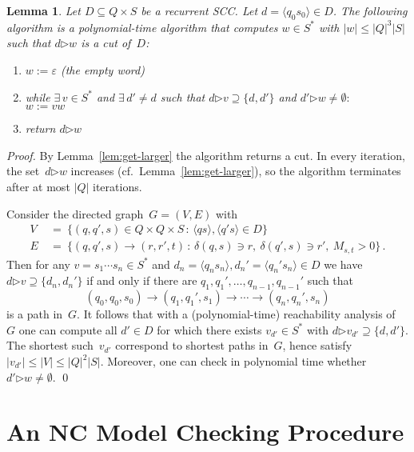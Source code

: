 \documentclass{elsarticle}
\newtheorem{lemma}[definition]{Lemma}
\def\<{\langle}
\def\>{\rangle}
\newcommand{\then}{\mathord{\triangleright}}
\begin{document}
\begin{lemma} \label{lem:compute-cut}
Let $D \subseteq Q \times S$ be a recurrent SCC.
Let $d = \<q_0 s_0\> \in D$.
The following algorithm is a polynomial-time algorithm that computes $w \in S^*$ with $|w| \leqslant |Q|^3 |S|$ such that $d \then w$ is a cut of~$D$:
\begin{enumerate}
\item $w := \varepsilon$ (the empty word)
\item while $\exists\, v \in S^*$ and $\exists\, d' \ne d$ such that $d \then v \supseteq \{d, d'\}$ and $d' \then w \ne \emptyset:$ \\
\mbox{}\hspace{4mm} $w := v w$
\item return $d \then w$
\end{enumerate}
\end{lemma}
\begin{proof}
By Lemma~\ref{lem:get-larger} the algorithm returns a cut.
In every iteration, the set~$d \then w$ increases (cf.~Lemma~\ref{lem:get-larger}), so the algorithm terminates after at most $|Q|$ iterations.

Consider the directed graph~$G = (V,E)$ with
\begin{align*}
V &\ = \ \{ (q, q', s) \in Q \times Q \times S \, : \, \<q s\>, \<q' s\> \in D \} \\
E &\ = \ \{ (q, q', s) \to (r, r', t) \, : \, \delta(q,s) \ni r,\ \delta(q',s) \ni r',\ M_{s,t} > 0\}\,.
\end{align*}
Then for any $v = s_1 \cdots s_n \in S^*$ and $d_n = \<q_n s_n\>, d_n' = \<q_n' s_n\> \in D$ we have $d \then v \supseteq \{d_n, d_n'\}$ if and only if there are $q_1, q_1', \ldots, q_{n-1}, q_{n-1}'$ such that
\[
(q_0,q_0,s_0) \to (q_1,q_1',s_1) \to \cdots \to (q_n,q_n',s_n)
\]
is a path in~$G$.
It follows that with a (polynomial-time) reachability analysis of~$G$ one can compute all $d' \in D$ for which there exists $v_{d'} \in S^*$ with $d \then v_{d'} \supseteq \{d, d'\}$.
The shortest such~$v_{d'}$ correspond to shortest paths in~$G$, hence satisfy $|v_{d'}| \leqslant |V| \leqslant |Q|^2 |S|$.
Moreover, one can check in polynomial time whether $d' \then w \ne \emptyset$.
\qed
\end{proof}

\section{An NC Model Checking Procedure} \label{sec:NC}
\end{document}

